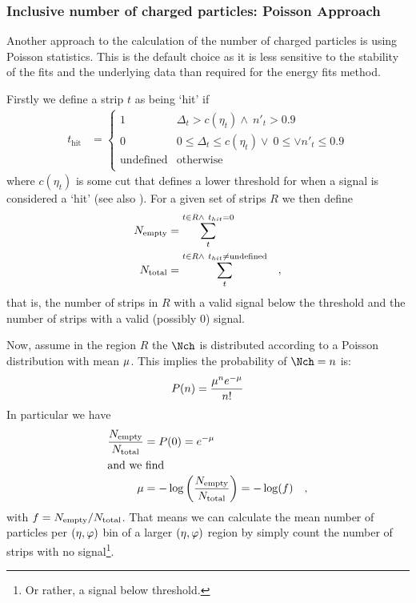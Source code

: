 \subsubsection{Inclusive number of charged particles: Poisson Approach} 
\label{sec:sub:sub:poisson}

\newcommand\muR{\ensuremath\mu} Another approach to the calculation of
the number of charged particles is using Poisson statistics. This is
the default choice as it is less sensitive to the stability of the
fits and the underlying data than required for the energy fits method.

Firstly we define a strip $t$ as being `hit' if 
\begin{align*}
  t_{\text{hit}} &= \left\{ 
    \begin{array}{cl}
      1 & \Delta_t > c(\eta_t) \wedge\ n'_t > 0.9\\
      0 & 0 \leq \Delta_t \leq c(\eta_t)\vee\  0 \leq \vee n'_t \leq 0.9\\
      \text{undefined} & \text{otherwise}\\ 
    \end{array}\right.
\end{align*}
where $c(\eta_t)$ is some cut that defines a lower threshold for when
a signal is considered a `hit' (see also ).  For a
given set of strips $R$ we then define 
\begin{align*}
  \Nempty{} &= \sum_t^{t\in R\wedge\ t_{hit}=0}\\
  \Ntotal{} &= \sum_t^{t\in R\wedge\ t_{hit}\neq\text{undefined}}\quad,\\
\end{align*}
that is, the number of strips in $R$ with a valid signal below the
threshold and the number of strips with a valid (possibly 0) signal. 

Now, assume in the region $R$ the $\mult$ is distributed according to
a Poisson distribution with mean $\muR$.  This implies the
probability of $\mult=n$ is:
\begin{equation}
  P(n) = \frac{\muR^n e^{-\muR}}{n!} \label{eq:PoissonDef}
\end{equation}
In particular we have 
\begin{align*}
  \frac{\Nempty{}}{\Ntotal{}} &=   P(0) = e^{-\muR} \\
\intertext{and we find}
   \muR &= -\log\left(\frac{\Nempty{}}{\Ntotal{}}\right) = -\log(f)\quad,
\end{align*}
with $f={N_{\text{empty}}}{}/{N_{\text{total}}}{}$.  That means we can calculate the mean
number of particles per $(\eta,\varphi)$ bin of a larger $(\eta,\varphi)$ region by
simply count the number of strips with no signal\footnote{Or rather, a
  signal below threshold.}.

